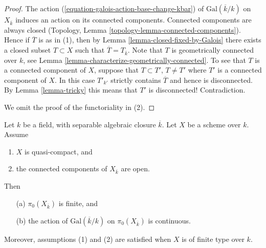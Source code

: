 \begin{proof}
The action (\ref{equation-galois-action-base-change-kbar})
of $\text{Gal}(\overline{k}/k)$ on $X_{\overline{k}}$
induces an action on its connected components.
Connected components are always closed
(Topology, Lemma \ref{topology-lemma-connected-components}).
Hence if $\overline{T}$ is as in (1), then by
Lemma \ref{lemma-closed-fixed-by-Galois} there exists a closed
subset $T \subset X$ such that $\overline{T} = T_{\overline{k}}$.
Note that $T$ is geometrically connected over $k$, see
Lemma \ref{lemma-characterize-geometrically-connected}.
To see that $T$ is a connected component of $X$, suppose that
$T \subset T'$, $T \not = T'$ where $T'$ is a connected component of $X$.
In this case $T'_{k'}$ strictly contains $\overline{T}$ and hence is
disconnected. By Lemma \ref{lemma-tricky} this means that $T'$ is
disconnected! Contradiction.

\medskip\noindent
We omit the proof of the functoriality in (2).
\end{proof}

\begin{lemma}
\label{lemma-galois-action-connected-components-continuous}
Let $k$ be a field, with separable algebraic closure $\overline{k}$.
Let $X$ be a scheme over $k$.
Assume
\begin{enumerate}
\item $X$ is quasi-compact, and
\item the connected components of $X_{\overline{k}}$ are open.
\end{enumerate}
Then
\begin{enumerate}
\item[(a)] $\pi_0(X_{\overline{k}})$ is finite, and
\item[(b)] the action of $\text{Gal}(\overline{k}/k)$ on
$\pi_0(X_{\overline{k}})$ is continuous.
\end{enumerate}
Moreover, assumptions (1) and (2) are satisfied when $X$ is
of finite type over $k$.
\end{lemma}

